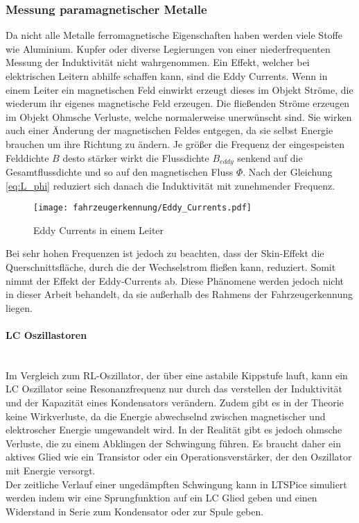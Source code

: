 \subsubsection{Messung paramagnetischer Metalle}
Da nicht alle Metalle ferromagnetische Eigenschaften haben werden viele Stoffe wie Aluminium. Kupfer oder diverse Legierungen
von einer niederfrequenten Messung der Induktivität nicht wahrgenommen. Ein Effekt, welcher bei elektrischen Leitern abhilfe schaffen kann, sind 
die Eddy Currents. Wenn in einem Leiter ein magnetischen Feld einwirkt erzeugt dieses im Objekt Ströme, die wiederum ihr eigenes magnetische Feld erzeugen.
Die fließenden Ströme erzeugen im Objekt Ohmsche Verluste, welche normalerweise unerwünscht sind. Sie wirken auch einer Änderung der magnetischen Feldes entgegen,
da sie selbst Energie brauchen um ihre Richtung zu ändern. Je größer die Frequenz der eingespeisten Felddichte $B$ desto stärker wirkt die 
Flussdichte $B_{eddy}$ senkend auf die Gesamtflussdichte und so auf den magnetischen Fluss $\Phi$. 
Nach der Gleichung \ref{eq:L_phi} reduziert sich danach die Induktivität mit zunehmender Frequenz.


\begin{figure}[H]
    \centering
    \texttt{[image: fahrzeugerkennung/Eddy\_Currents.pdf]}
    \caption{Eddy Currents in einem Leiter}
\end{figure}

Bei sehr hohen Frequenzen ist jedoch zu beachten, dass der Skin-Effekt die Querschnittsfläche, durch die der Wechselstrom fließen kann,
reduziert. Somit nimmt der Effekt der Eddy-Currents ab. Diese Phänomene werden jedoch nicht in dieser Arbeit behandelt, da sie außerhalb des Rahmens der 
Fahrzeugerkennung liegen. 

\paragraph{LC Oszillastoren}\mbox{}\\

Im Vergleich zum RL-Oszillator, der über eine astabile Kippstufe lauft, kann ein LC Oszillator seine Resonanzfrequenz nur durch das verstellen der Induktivität und der Kapazität 
eines Kondensators verändern. Zudem gibt es in der Theorie keine Wirkverluste, da die Energie abwechselnd zwischen magnetischer und elektroscher Energie umgewandelt wird. In der Realität gibt es jedoch
ohmsche Verluste, die zu einem Abklingen der Schwingung führen. Es braucht daher ein aktives Glied wie ein Transistor oder ein Operationsverstärker, der den Oszillator mit Energie versorgt.
\\
Der zeitliche Verlauf einer ungedämpften Schwingung kann in LTSPice simuliert werden indem wir eine Sprungfunktion auf ein LC Glied geben und einen Widerstand in Serie zum Kondensator oder zur
Spule geben.

